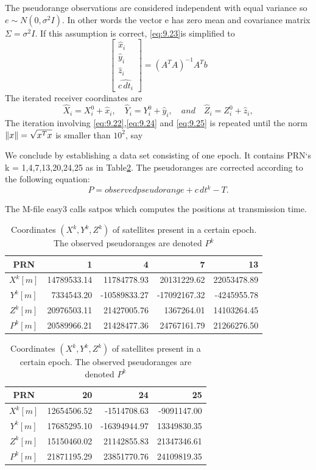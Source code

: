 	The pseudorange observations are considered independent with equal variance so $e\sim N(0,\sigma^2I)$. In other words the vector e has zero mean and covariance matrix $\Sigma = \sigma^2I$. If this assumption is correct, \ref{eq:9.23}is simplified to
	\begin{equation}\label{eq:9.24}
		\begin{bmatrix}
			\hat{x}_i \\ \hat{y}_i \\ \hat{z}_i \\ \hat{c\,dt_i}
		\end{bmatrix}
		=(A^TA)^{-1}A^Tb
	\end{equation}
	The iterated receiver coordinates are
	\begin{equation}\label{eq:9.25}
		\hat{X}_i=X^0_i+\hat{x}_i,\quad \hat{Y}_i=Y^0_i+\hat{y}_i,\quad and \quad \hat{Z}_i=Z^0_i+\hat{z}_i,
	\end{equation}
	The iteration involving \ref{eq:9.22},\ref{eq:9.24} and \ref{eq:9.25} is repeated until the norm $\Arrowvert x\Arrowvert=\sqrt{x^Tx}$ is smaller than $10^2$, say
	
	We conclude by establishing a data set consisting of one epoch. It contains PRN`s k = 1,4,7,13,20,24,25 as in Table\ref{tab:9.4}. The pseudoranges are corrected according to the following equation:
	\begin{equation}\label{eq:9.26}
		P = observed pseudorange + c\,dt^k-T.
	\end{equation}
	
	The M-file easy3 calls satpos which computes the positions at transmission time.
	\begin{table}
		\caption{Coordinates $(X^k,Y^k,Z^k)$ of satellites present in a certain epoch. The observed pseudoranges are denoted $P^k$}
		\label{tab:9.4}
		\begin{tabular}{crrrr}
			\hline
			PRN & 1 & 4 & 7 & 13 \\ 
			\hline
			$X^k[m]$ & 14789533.14 &  11784778.93 &  20131229.62 & 22053478.89  \\ 
			$Y^k[m]$ &  7334543.20 & -10589833.27 & -17092167.32 & -4245955.78  \\ 
			$Z^k[m]$ & 20976503.11 &  21427005.76 &   1367264.01 & 14103264.45  \\ 
			$P^k[m]$ & 20589966.21 &  21428477.36 &  24767161.79 & 21266276.50  \\ 
			\hline
		\end{tabular} 
		\begin{tabular}{crrr}
			\hline
			PRN & 20 & 24 & 25 \\
			\hline
			$X^k[m]$ & 12654506.52 &  -1514708.63 & -9091147.00 \\
			$Y^k[m]$ & 17685295.10 & -16394944.97 & 13349830.35 \\ 
			$Z^k[m]$ & 15150460.02 &  21142855.83 & 21347346.61 \\ 
			$P^k[m]$ & 21871195.29 &  23851770.76 & 24109819.35 \\ 
			\hline
		\end{tabular}
	\end{table}	
		
